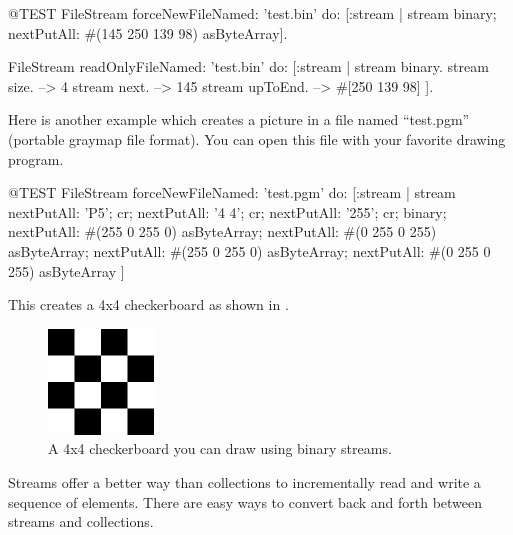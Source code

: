 \documentclass[a4paper,10pt,twoside]{book}
\begin{document}
{\begin{code}{@TEST}
FileStream
  forceNewFileNamed: 'test.bin'
  do: [:stream |
          stream
            binary;
            nextPutAll: #(145 250 139 98) asByteArray].

FileStream
  readOnlyFileNamed: 'test.bin'
  do: [:stream |
          stream binary.
          stream size.         --> 4
          stream next.         --> 145
          stream upToEnd. --> #[250 139 98]
      ].
\end{code}

Here is another example which creates a picture in a file named
``test.pgm'' (portable graymap file format). You can open this file with your favorite drawing program.

\begin{code}{@TEST}
FileStream
  forceNewFileNamed: 'test.pgm' 
  do: [:stream |
	stream
		nextPutAll: 'P5'; cr;
		nextPutAll: '4 4'; cr;
		nextPutAll: '255'; cr;
		binary;
		nextPutAll: #(255 0 255 0) asByteArray;
		nextPutAll: #(0 255 0 255) asByteArray;
		nextPutAll: #(255 0 255 0) asByteArray;
		nextPutAll: #(0 255 0 255) asByteArray
	]
\end{code}

This creates a 4x4 checkerboard as shown in .

\begin{figure}[!ht]
\centerline{\includegraphics[width=0.25\textwidth]{checkerboard4x4}}
\caption{A 4x4 checkerboard you can draw using binary streams.}
\vspace{.2in}
\end{figure}


Streams offer a better way than collections to incrementally read and write a sequence of elements. There are easy ways to convert back and forth between streams and collections.

}
\end{document}
